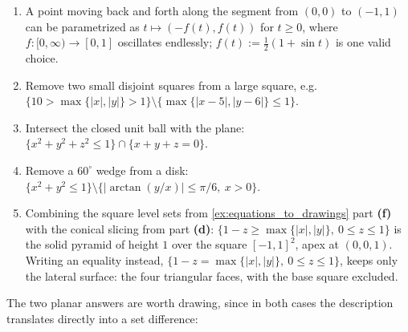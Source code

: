 \begin{exercisesolution}
\label{sol:drawings_to_equations}
\begin{enumerate}[label=\textbf{(\alph*)}]
  \item A point moving back and forth along the segment from $(0,0)$ to $(-1,1)$ can be
    parametrized as $t \mapsto (-f(t), f(t))$ for $t \geq 0$, where $f : [0,\infty) \to [0,1]$
    oscillates endlessly; $f(t) := \tfrac{1}{2}(1+\sin t)$ is one valid choice.
  \item Remove two small disjoint squares from a large square, e.g.
    $\{10 > \max\{|x|,|y|\} > 1\} \setminus \{\max\{|x-5|,|y-6|\} \leq 1\}$.
  \item Intersect the closed unit ball with the plane: $\{x^2+y^2+z^2 \leq 1\} \cap \{x+y+z=0\}$.
  \item Remove a $60^\circ$ wedge from a disk:
    $\{x^2+y^2 \leq 1\} \setminus \{|\arctan(y/x)| \leq \pi/6,\ x>0\}$.
  \item Combining the square level sets from \cref{ex:equations_to_drawings} part \textbf{(f)} with the conical
    slicing from part \textbf{(d)}: $\{1-z \geq \max\{|x|,|y|\},\ 0 \leq z \leq 1\}$ is the solid
    pyramid of height $1$ over the square $[-1,1]^2$, apex at $(0,0,1)$. Writing an equality
    instead, $\{1-z = \max\{|x|,|y|\},\ 0 \leq z \leq 1\}$, keeps only the lateral surface: the
    four triangular faces, with the base square excluded.
\end{enumerate}

The two planar answers are worth drawing, since in both cases the description 
translates directly into a set difference:

\begin{center}
\begin{tikzpicture}[>=Latex, scale=1.0]


\end{tikzpicture}
\end{center}
\end{exercisesolution}
